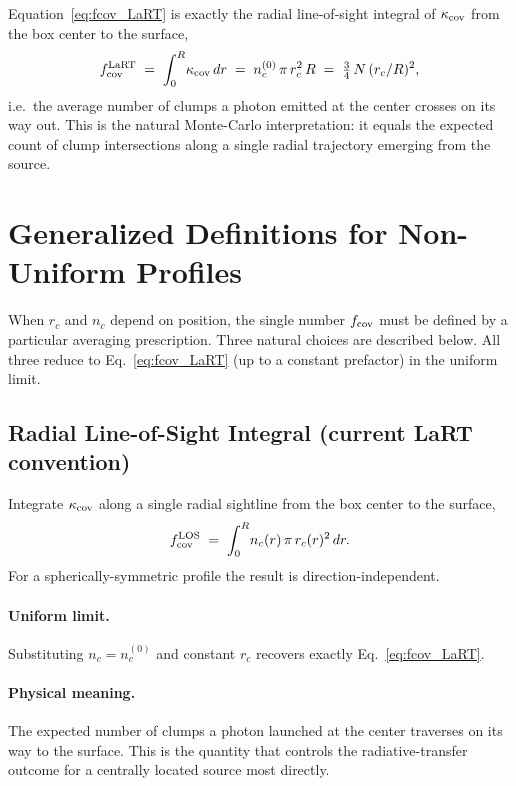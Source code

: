 \documentclass[english,a4paper]{my_memo}
\begin{document}
Equation~\eqref{eq:fcov_LaRT} is exactly the radial line-of-sight integral
of $\kappa_{\rm cov}$ from the box center to the surface,
\begin{equation}
   f_{\rm cov}^{\rm LaRT}
   \;=\; \int_{0}^{R}\! \kappa_{\rm cov}\,dr
   \;=\; n_c^{(0)}\,\pi\,r_c^{2}\,R
   \;=\; \tfrac{3}{4}\,N\,(r_c/R)^{2},
\end{equation}
i.e.~the average number of clumps a photon emitted at the center crosses on
its way out.  This is the natural Monte-Carlo interpretation: it equals the
expected count of clump intersections along a single radial trajectory
emerging from the source.

\section{Generalized Definitions for Non-Uniform Profiles}

When $r_c$ and $n_c$ depend on position, the single number $f_{\rm cov}$ must
be defined by a particular averaging prescription.  Three natural choices
are described below.  All three reduce to Eq.~\eqref{eq:fcov_LaRT} (up to a
constant prefactor) in the uniform limit.

\subsection{Radial Line-of-Sight Integral (current LaRT convention)}
\label{sec:los}

Integrate $\kappa_{\rm cov}$ along a single radial sightline from the box
center to the surface,
\begin{equation}
   f_{\rm cov}^{\rm LOS}
   \;=\; \int_{0}^{R}\! n_c(r)\,\pi\,r_c(r)^{2}\,dr.
   \label{eq:fcov_los}
\end{equation}
For a spherically-symmetric profile the result is direction-independent.

\paragraph{Uniform limit.} Substituting $n_c=n_c^{(0)}$ and constant $r_c$
recovers exactly Eq.~\eqref{eq:fcov_LaRT}.

\paragraph{Physical meaning.} The expected number of clumps a photon
launched at the center traverses on its way to the surface.  This is the
quantity that controls the radiative-transfer outcome for a centrally
located source most directly.
\end{document}
